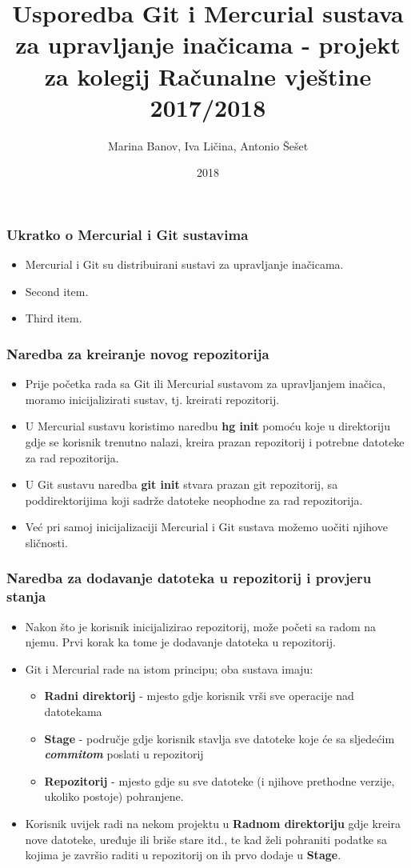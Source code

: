 \documentclass{beamer}
\title{Usporedba Git i Mercurial sustava za upravljanje inačicama - projekt za kolegij Računalne vještine 2017/2018}
\author{Marina Banov, Iva Ličina, Antonio Šešet}
\institute{Tehnički fakultet u Rijeci}
\date{2018}
\begin{document}
 
	\frame{\titlepage}
 
	\begin{frame}
		\frametitle{Ukratko o Mercurial i Git sustavima}
		 \begin{itemize}
			\item Mercurial i Git su distribuirani sustavi za upravljanje inačicama.
			\item Second item.
			\item Third item.
		\end{itemize}
	\end{frame}

	\begin{frame}
		\frametitle{Naredba za kreiranje novog  repozitorija}
		\begin{itemize}
			\item Prije početka rada sa Git ili Mercurial sustavom za upravljanjem inačica, moramo inicijalizirati sustav, tj. kreirati repozitorij.		
			\item U Mercurial sustavu koristimo naredbu \textbf{hg init} pomoću koje u direktoriju gdje se korisnik trenutno nalazi, kreira prazan repozitorij i  potrebne datoteke za rad repozitorija. 
			\item U Git sustavu naredba \textbf{git init} stvara prazan git repozitorij, sa poddirektorijima koji sadrže datoteke neophodne za rad repozitorija.
			\item Već pri samoj inicijalizaciji Mercurial i Git sustava možemo uočiti njihove sličnosti.
		\end{itemize}
	\end{frame}

	\begin{frame}
		\frametitle{Naredba za dodavanje datoteka u repozitorij i provjeru stanja}
		\begin{itemize}
			\item Nakon što je korisnik inicijalizirao repozitorij, može početi sa radom na njemu. Prvi korak ka tome je dodavanje datoteka u repozitorij.
			\item Git i Mercurial rade na istom principu; oba sustava imaju:
			\begin{itemize}
				\item \textbf{Radni direktorij} - mjesto gdje korisnik vrši sve operacije nad datotekama
				\item \textbf{Stage} - područje gdje korisnik stavlja sve datoteke koje će sa sljedećim \textbf{\textit{commitom}} poslati u repozitorij
				\item \textbf{Repozitorij} - mjesto gdje su sve datoteke (i njihove prethodne verzije, ukoliko postoje) pohranjene.
			\end{itemize}
			\item Korisnik uvijek radi na nekom projektu u \textbf{Radnom direktoriju} gdje kreira nove datoteke, uređuje ili briše stare itd., te kad želi pohraniti podatke sa kojima je završio raditi u repozitorij on ih prvo dodaje u \textbf{Stage}.
		\end{itemize}
	\end{frame}
\end{document}
